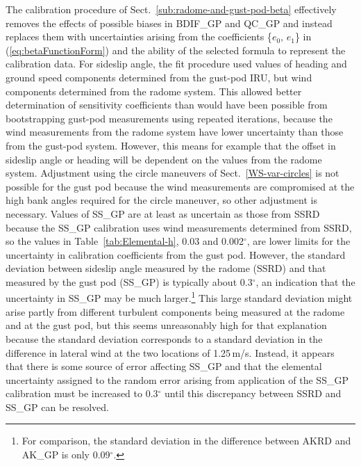 \documentclass[12pt,twoside,english]{article}\usepackage[]{graphicx}\usepackage[]{color}
\let\OrgIndex\index
\renewcommand*{\index}[1]{\OrgIndex{#1}}
\begin{document}
{{\begin{enumerate}
The calibration procedure of Sect.~\ref{sub:radome-and-gust-pod-beta} effectively removes the effects of possible biases in BDIF\_GP and QC\_GP and instead replaces them with uncertainties arising from the coefficients \{$e_{0},\,e_{1}$\} in (\ref{eq:betaFunctionForm}) and the ability of the selected formula to represent the calibration data. For sideslip angle, the fit procedure used values of heading and ground speed components determined from the gust-pod IRU, but wind components determined from the radome system. This allowed better determination of sensitivity coefficients than would have been possible from \textquotedbl{}bootstrapping\textquotedbl{} gust-pod measurements using repeated iterations, because the wind measurements from the radome system have lower uncertainty than those from the gust-pod system. However, this means for example that the offset in sideslip angle or heading will be dependent on the values from the radome system. Adjustment using the circle maneuvers of Sect.~\ref{WS-var-circles} is not possible for the gust pod because the wind measurements are compromised at the high bank angles required for the circle maneuver, so other adjustment is necessary. Values of SS\_GP are at least as uncertain as those from SSRD because the SS\_GP calibration uses wind measurements determined from SSRD, so the values in Table~\ref{tab:Elemental-h}, 0.03 and 0.002$^{\circ}$, are lower limits for the uncertainty in calibration coefficients from the gust pod. However, the standard deviation between sideslip angle measured by the radome (SSRD) and that measured by the gust pod (SS\_GP) is typically about 0.3$^{\circ}$, an indication that the uncertainty in SS\_GP may be much larger.\footnote{For comparison, the standard deviation in the difference between AKRD and AK\_GP is only 0.09$^{\circ}$.} This large standard deviation might arise partly from different turbulent components being measured at the radome and at the gust pod, but this seems unreasonably high for that explanation because the standard deviation corresponds to a standard deviation in the difference in lateral wind at the two locations of 1.25\,m/s. Instead, it appears that there is some source of error affecting SS\_GP and that the elemental uncertainty assigned to the random error arising from application of the SS\_GP calibration must be increased to 0.3$^{\circ}$ until this discrepancy between SSRD and SS\_GP can be resolved.  

\end{enumerate}}}
\end{document}
